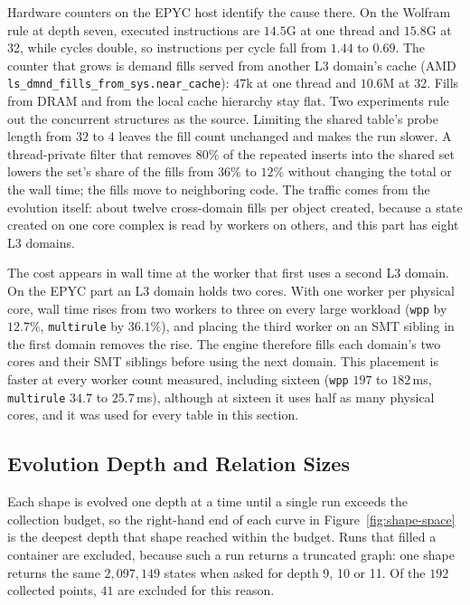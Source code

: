 Hardware counters on the EPYC host identify the cause there. On the Wolfram rule at depth seven, executed instructions
are $14.5$G at one thread and $15.8$G at 32, while cycles double, so instructions per cycle fall
from $1.44$ to $0.69$. The counter that grows is demand fills served from another L3 domain's cache
(AMD \texttt{ls\_dmnd\_fills\_from\_sys.near\_cache}): $47$k at one thread and $10.6$M at 32. Fills
from DRAM and from the local cache hierarchy stay flat. Two experiments rule out the concurrent
structures as the source. Limiting the shared table's probe length from $32$ to $4$ leaves the fill
count unchanged and makes the run slower. A thread-private filter that removes $80\%$ of the
repeated inserts into the shared set lowers the set's share of the fills from $36\%$ to $12\%$
without changing the total or the wall time; the fills move to neighboring code. The traffic comes
from the evolution itself: about twelve cross-domain fills per object created, because a state
created on one core complex is read by workers on others, and this part has eight L3 domains.

The cost appears in wall time at the worker that first uses a second L3 domain. On the EPYC part
an L3 domain holds two cores. With one worker per physical core, wall time rises from two workers to
three on every large workload (\texttt{wpp} by $12.7\%$, \texttt{multirule} by $36.1\%$), and
placing the third worker on an SMT sibling in the first domain removes the rise. The engine
therefore fills each domain's two cores and their SMT siblings before using the next domain. This
placement is faster at every worker count measured, including sixteen (\texttt{wpp} $197$ to
$182$\,ms, \texttt{multirule} $34.7$ to $25.7$\,ms), although at sixteen it uses half as many
physical cores, and it was used for every table in this section.

\begin{table}[htbp]
\centering
\caption{User and system time, peak resident set and minor page faults against
thread count, from \texttt{getrusage}.}
\label{tab:t13-memory}

\end{table}

\subsection{Evolution Depth and Relation Sizes}
\label{sec:shape-space}

Each shape is evolved one depth at a time until a single run exceeds the collection budget, so the
right-hand end of each curve in Figure~\ref{fig:shape-space} is the deepest depth that shape
reached within the budget. Runs that filled a container are excluded, because such a run returns
a truncated graph: one shape returns the same $2{,}097{,}149$ states when asked for depth 9, 10 or
11. Of the $192$ collected points, $41$ are excluded for this reason.


